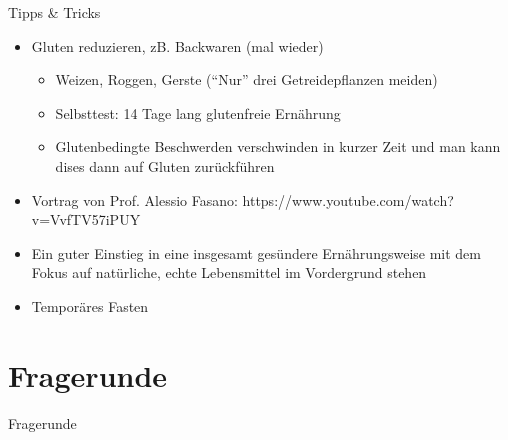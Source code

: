 \documentclass[xcolor=dvipsnames]{beamer}
\begin{document}
    \begin{frame}{Tipps \& Tricks}
        \begin{itemize}
            \setlength\itemsep{1em}
            \item Gluten reduzieren, zB. Backwaren (mal wieder)
            \begin{itemize}
                \item Weizen, Roggen, Gerste ("`Nur"' drei Getreidepflanzen meiden)
                \item Selbsttest: 14 Tage lang glutenfreie Ernährung
                \item Glutenbedingte Beschwerden verschwinden in kurzer Zeit und man kann dises dann auf Gluten zurückführen
            \end{itemize}
            \item Vortrag von Prof. Alessio Fasano: https://www.youtube.com/watch?v=VvfTV57iPUY
            \item Ein guter Einstieg in eine insgesamt gesündere Ernährungsweise mit dem Fokus auf natürliche, echte Lebensmittel im Vordergrund stehen
            \item Temporäres Fasten
        \end{itemize}
    \end{frame}

    \section{Fragerunde}
    {
        \begin{frame}
            \begin{center}
                \Huge Fragerunde
            \end{center}
        \end{frame}
    }
\end{document}
